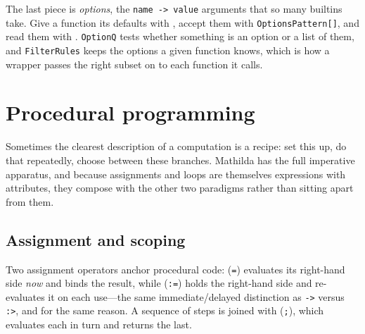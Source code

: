 The last piece is \emph{options}, the \texttt{name -> value} arguments that so many
builtins take. Give a function its defaults with , accept them with
\texttt{OptionsPattern[]}, and read them with . \texttt{OptionQ} tests
whether something is an option or a list of them, and \texttt{FilterRules} keeps the
options a given function knows, which is how a wrapper passes the right subset on to
each function it calls.

\begin{codepairs}
\end{codepairs}

\section{Procedural programming}
\label{sec:prog-procedural}

Sometimes the clearest description of a computation is a recipe: set this up, do
that repeatedly, choose between these branches. Mathilda has the full
imperative apparatus, and because assignments and loops are themselves
expressions with attributes, they compose with the other two paradigms rather
than sitting apart from them.

\subsection{Assignment and scoping}
\label{ssec:prog-scoping}

Two assignment operators anchor procedural code:  (\texttt{=}) evaluates
its right-hand side \emph{now} and binds the result, while 
(\texttt{:=}) holds the right-hand side and re-evaluates it on each use---the same
immediate/delayed distinction as \texttt{->} versus \texttt{:>}, and for the same
reason. A sequence of steps is joined with 
(\texttt{;}), which evaluates each in turn and returns the last.

